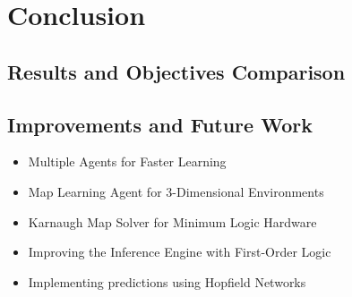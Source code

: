 






\chapter{Conclusion} 
\label{Conclusion}
\section{Results and Objectives Comparison}
\section{Improvements and Future Work}

\begin{itemize}
	\item Multiple Agents for Faster Learning
	\item Map Learning Agent for 3-Dimensional Environments
	\item Karnaugh Map Solver for Minimum Logic Hardware
	\item Improving the Inference Engine with First-Order Logic
	\item Implementing predictions using Hopfield Networks
\end{itemize}
